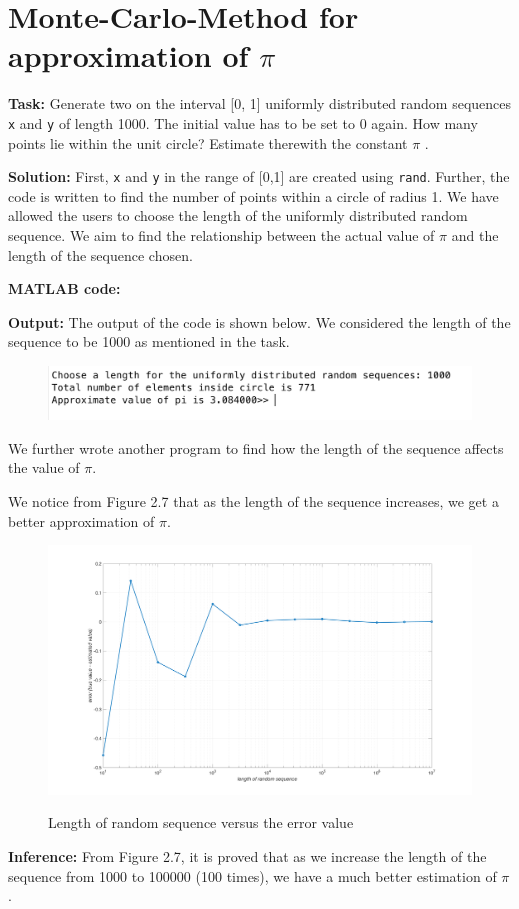 \section{ Monte-Carlo-Method for approximation of $\pi$ }  \label{Monte-Carlo-Method }
\noindent \textbf{Task:} Generate two on the interval [0, 1] uniformly distributed random sequences \texttt{x} and \texttt{y} of length 1000. The initial value has to be set to 0 again. How many points lie within the unit circle? Estimate therewith the constant $\pi$ .

\noindent \textbf{Solution:} First, \texttt{x} and \texttt{y} in the range of [0,1] are created using \texttt{rand}. Further, the code is written to find the number of points within a circle of radius 1. We have allowed the users to choose the length of the uniformly distributed random sequence. We aim to find the relationship between the actual value of $\pi$ and the length of the sequence chosen.

\noindent \textbf{MATLAB code:} 


\noindent \textbf{Output:} The output of the code is shown below. We considered the length of the sequence to be 1000 as mentioned in the task.
\begin{figure}[H]
\centering
{\includegraphics[scale=0.58]{ass6_1.png}}
\end{figure}
\noindent We further wrote another program to find how the length of the sequence affects the value of $\pi$. 

\noindent We notice from Figure 2.7 that as the length of the sequence increases, we get a better approximation of $\pi$.
\begin{figure}[H]
\centering
{\includegraphics[scale=0.13]{ass6_2.png}}
\caption{Length of random sequence versus the error value}
\label{Length of random sequence versus the error value}
\end{figure}

\noindent \textbf{Inference:} From Figure 2.7, it is proved that as we increase the length of the sequence from 1000 to 100000 (100 times), we have a much better estimation of $\pi$.
